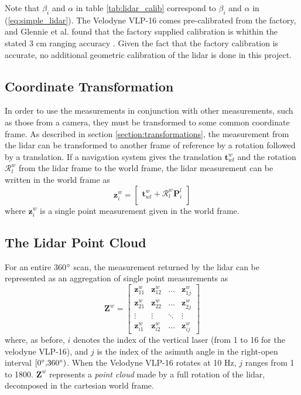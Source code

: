 Note that $\beta_i$ and $\alpha$ in table \ref{tab:lidar_calib} correspond to $\beta_i$ and $\alpha$ in (\ref{eq:simple_lidar}). The Velodyne VLP-16 comes pre-calibrated from the factory, and Glennie et al. found that the factory supplied calibration is whithin the stated 3 cm ranging accuracy \cite{GlennieVLP}. Given the fact that the factory calibration is accurate, no additional geometric calibration of the lidar is done in this project.
\subsection{Coordinate Transformation}
In order to use the measurements in conjunction with other measurements, such as those from a camera, they must be transformed to some common coordinate frame. As described in section \ref{section:transformations}, the measurement from the lidar can be transformed to another frame of reference by a rotation followed by a translation. If a navigation system gives the translation $\mathbf{t}^{w}_{wl}$ and the rotation $\mathcal{R}^{w}_{l}$ from the lidar frame to the world frame, the lidar measurement can be written in the world frame as
\begin{equation}
\mathbf{z}^w_{i} = \begin{bmatrix}
\mathbf{t}^w_{wl}+\mathcal{R}^{w}_{l}\mathbf{P}^{l}_{i}\\
\end{bmatrix}
\end{equation}
where $\mathbf{z}^w_{i}$ is a single point measurement given in the world frame.
\subsection{The Lidar Point Cloud}
For an entire 360$\degree$ scan, the measurement returned by the lidar can be represented as an aggregation of single point measurements as
\begin{equation}
\mathbf{Z}^w=\begin{bmatrix}
\mathbf{z}^{w}_{11} & \mathbf{z}^{w}_{12} & \dots & \mathbf{z}^{w}_{1j}\\
\mathbf{z}^{w}_{21} & \mathbf{z}^{w}_{22} & \dots & \mathbf{z}^{w}_{2j}\\
\vdots & \vdots & \ddots & \vdots \\
\mathbf{z}^{w}_{i1} & \mathbf{z}^{w}_{i2} & \dots & \mathbf{z}^{w}_{ij}
\end{bmatrix}
\end{equation}
where, as before, $i$ denotes the index of the vertical laser (from 1 to 16 for the velodyne VLP-16), and $j$ is the index of the asimuth angle in the right-open interval $\interval[{0\degree,360\degree})$. When the Velodyne VLP-16 rotates at 10 Hz, $j$ ranges from 1 to 1800. $\mathbf{Z}^w$ represents a \textit{point cloud} made by a full rotation of the lidar, decomposed in the cartesian world frame.


\cleardoublepage